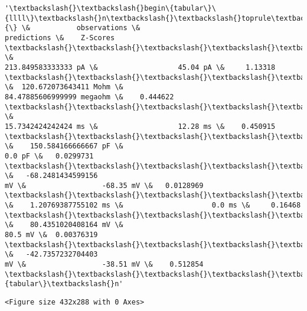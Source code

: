             \begin{tcolorbox}[breakable, size=fbox, boxrule=.5pt, pad at break*=1mm, opacityfill=0]
\begin{Verbatim}[commandchars=\\\{\}]
'\textbackslash{}\textbackslash{}begin\{tabular\}\{llll\}\textbackslash{}n\textbackslash{}\textbackslash{}toprule\textbackslash{}n\{\} \&           observations \&
predictions \&    Z-Scores \textbackslash{}\textbackslash{}\textbackslash{}\textbackslash{}\textbackslash{}n\textbackslash{}\textbackslash{}midrule\textbackslash{}nRheobaseTest                   \&
213.849583333333 pA \&                   45.04 pA \&     1.13318
\textbackslash{}\textbackslash{}\textbackslash{}\textbackslash{}\textbackslash{}nInputResistanceTest            \&  120.672073643411 Mohm \&
84.47885606999999 megaohm \&    0.444622 \textbackslash{}\textbackslash{}\textbackslash{}\textbackslash{}\textbackslash{}nTimeConstantTest               \&
15.7342424242424 ms \&                   12.28 ms \&    0.450915
\textbackslash{}\textbackslash{}\textbackslash{}\textbackslash{}\textbackslash{}nCapacitanceTest                \&    150.584166666667 pF \&
0.0 pF \&   0.0299731 \textbackslash{}\textbackslash{}\textbackslash{}\textbackslash{}\textbackslash{}nRestingPotentialTest           \&   -68.2481434599156
mV \&                  -68.35 mV \&   0.0128969 \textbackslash{}\textbackslash{}\textbackslash{}\textbackslash{}\textbackslash{}nInjectedCurrentAPWidthTest
\&    1.20769387755102 ms \&                     0.0 ms \&     0.16468
\textbackslash{}\textbackslash{}\textbackslash{}\textbackslash{}\textbackslash{}nInjectedCurrentAPAmplitudeTest \&    80.4351020408164 mV \&
80.5 mV \&  0.00376319 \textbackslash{}\textbackslash{}\textbackslash{}\textbackslash{}\textbackslash{}nInjectedCurrentAPThresholdTest \&   -42.7357232704403
mV \&                  -38.51 mV \&    0.512854
\textbackslash{}\textbackslash{}\textbackslash{}\textbackslash{}\textbackslash{}n\textbackslash{}\textbackslash{}bottomrule\textbackslash{}n\textbackslash{}\textbackslash{}end\{tabular\}\textbackslash{}n'
\end{Verbatim}
\end{tcolorbox}
        
    
    \begin{verbatim}
<Figure size 432x288 with 0 Axes>
    \end{verbatim}

    
    \begin{center}
    \end{center}
    { \hspace*{\fill} \\}
    
